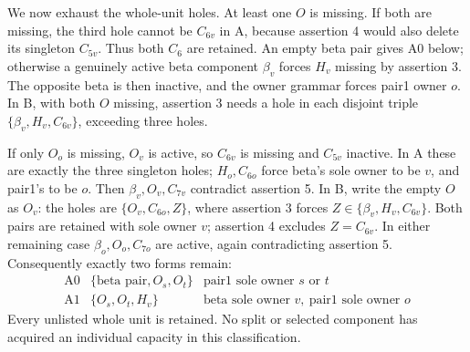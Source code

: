 \documentclass[11pt,letterpaper]{article}
\theoremstyle{definition}\newtheorem{definition}[theorem]{Definition}
\begin{document}
We now exhaust the whole-unit holes. At least one $O$ is missing. If
both are missing, the third hole cannot be $C_{6v}$ in A, because
assertion 4 would also delete its singleton $C_{5v}$. Thus both $C_6$
are retained. An empty beta pair gives A0 below; otherwise a genuinely
active beta component $\beta_v$ forces $H_v$ missing by assertion 3.
The opposite beta is then inactive, and the owner grammar forces
pair1 owner $o$. In B, with both $O$ missing, assertion 3 needs a hole
in each disjoint triple $\{\beta_v,H_v,C_{6v}\}$, exceeding three holes.

If only $O_o$ is missing, $O_v$ is active, so $C_{6v}$ is missing and
$C_{5v}$ inactive. In A these are exactly the three singleton holes;
$H_o,C_{6o}$ force beta's sole owner to be $v$, and pair1's to be $o$.
Then $\beta_v,O_v,C_{7v}$ contradict assertion 5.
In B, write the empty $O$ as $O_v$: the holes are
$\{O_v,C_{6o},Z\}$, where assertion 3 forces
$Z\in\{\beta_v,H_v,C_{6v}\}$. Both pairs are retained with sole owner
$v$; assertion 4 excludes $Z=C_{6v}$. In either remaining case
$\beta_o,O_o,C_{7o}$ are active, again contradicting assertion 5.
Consequently exactly two forms remain:
\begin{equation}\label{eq:p3-forms}
\begin{array}{c|l|l}
\mathrm{A0}&\{\text{beta pair},O_s,O_t\}&\text{pair1 sole owner }s\text{ or }t\\
\mathrm{A1}&\{O_s,O_t,H_v\}&\text{beta sole owner }v,\ \text{pair1 sole owner }o
\end{array}
\end{equation}
Every unlisted whole unit is retained. No split or selected component
has acquired an individual capacity in this classification.
\end{document}
